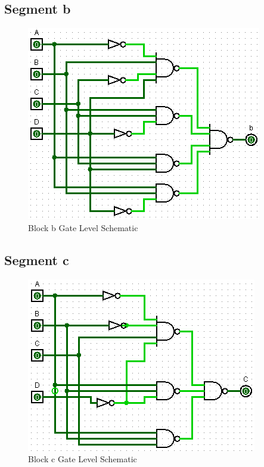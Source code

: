 \documentclass[12pt]{article}
\begin{document}
\subsection{Segment b}

\begin{figure}[H]
	\centering
	\label{fig:bBlockGates}
	\includegraphics[width=0.5\linewidth, keepaspectratio]{b_logicCkt}
	\caption{Block b Gate Level Schematic}
\end{figure}

\subsection{Segment c}
\begin{figure}[H]
	\centering
	\label{fig:cBlockGates}
	\includegraphics[width=0.5\linewidth, keepaspectratio]{c_logicCkt}
	\caption{Block c Gate Level Schematic}
\end{figure}

\end{document}
